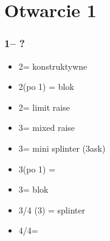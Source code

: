 \documentclass[12pt, a4paper]{report}
\begin{document}
\section*{\colorbox{blue!30}{Otwarcie 1\major}}
 {

    \subsubsection*{1\major -- ?}
    \begin{itemize}
        \item 2\major = konstruktywne
        \item 2\spades (po 1\hearts) = blok
        \item 2\nt = limit raise
        \item 3\clubs = mixed raise
        \item 3\diams = mini splinter (3\hearts ask)
        \item 3\hearts (po 1\spades) = \nat\ \inv
        \item 3\major = blok
        \item 3\nt/4 (3\spades) = splinter
        \item 4\diams/4\hearts = \major
    \end{itemize}
}
\end{document}
